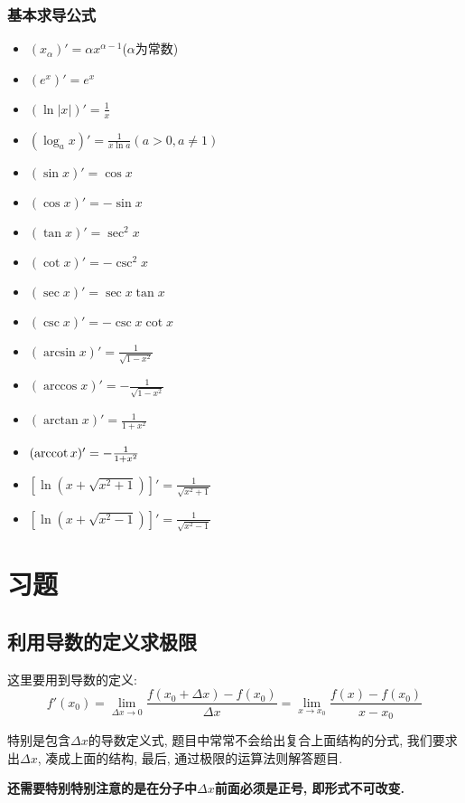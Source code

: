 \subsubsection{基本求导公式}
\begin{multicols}{2}
\begin{itemize}
\item $ (x_{\alpha})'=\alpha x^{\alpha-1} $($ \alpha $为常数)
\item $ (e^{x})'=e^{x} $
\item $ (\ln |x|)'=\frac{1}{x} $
\item $ (\log_{a}x)'=\frac{1}{x\ln a}(a>0,a\neq 1) $
\item $ (\sin x)'=\cos x $
\item $ (\cos x)'=-\sin x $
\item $ (\tan x)'=\sec^{2}x $
\item $ (\cot x)'=-\csc^{2}x $
\item $ (\sec x)'=\sec x\tan x $
\item $ (\csc x)'=-\csc x\cot x $
\item $ (\arcsin x)'=\frac{1}{\sqrt{1-x^{2}}} $
\item $ (\arccos x)'=-\frac{1}{\sqrt{1-x^{2}}} $
\item $ (\arctan x)'=\frac{1}{1+x^{2}} $
\item $ (\operatorname{arccot} x)'=-\frac{1}{1+x^{2}} $
\item $ [\ln(x+\sqrt{x^{2}+1})]'=\frac{1}{\sqrt{x^{2}+1}} $
\item $ [\ln (x+\sqrt{x^{2}-1})]'=\frac{1}{\sqrt{x^{2}-1}} $
\end{itemize}
\end{multicols}
\section{习题}
\subsection{利用导数的定义求极限}
这里要用到导数的定义:
\begin{equation*}
f'(x_{0})=\lim\limits_{\Delta x \rightarrow 0} \frac{f(x_{0}+\Delta x)-f(x_{0})}{\Delta x}=\lim\limits_{x \rightarrow x_{0}} \frac{f(x)-f(x_{0})}{x-x_{0}}
\end{equation*}\par
特别是包含$ \Delta x $的导数定义式, 题目中常常不会给出复合上面结构的分式, 我们要求出$ \Delta x $, 凑成上面的结构, 最后, 通过极限的运算法则解答题目.\par
\textbf{还需要特别特别注意的是在分子中$ \Delta x $前面必须是正号, 即形式不可改变.}

